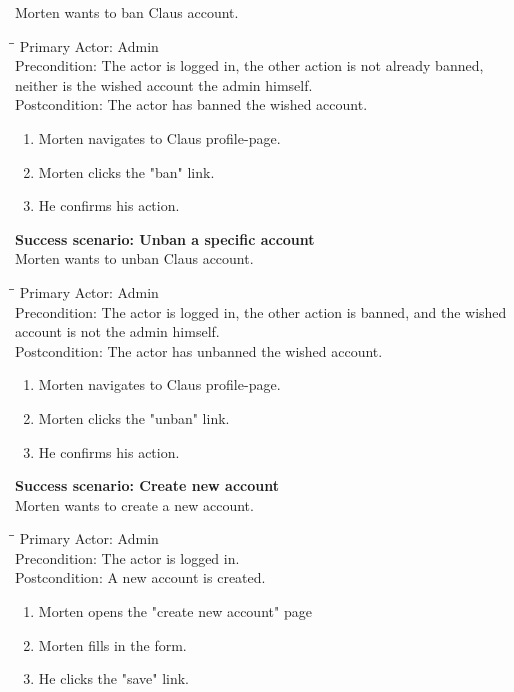 Morten wants to ban Claus account.
\begin{tabbing}
\hspace{5mm}\=\hspace{26mm}\=\kill
\>Primary Actor:\> Admin\\
\>Precondition:\> The actor is logged in, the other action is not already banned, neither is the wished account the admin himself.\\
\>Postcondition:\> The actor has banned the wished account.
\end{tabbing}
\begin{enumerate} \setlength{\itemsep}{-1mm}
	\item Morten navigates to Claus profile-page.
	\item Morten clicks the "ban" link.
	\item He confirms his action.
\end{enumerate}
\vspace{3mm}
\textbf{Success scenario: Unban a specific account} \\
Morten wants to unban Claus account.
\begin{tabbing}
\hspace{5mm}\=\hspace{26mm}\=\kill
\>Primary Actor:\> Admin\\
\>Precondition:\> The actor is logged in, the other action is banned, and the wished account is not the admin himself.\\
\>Postcondition:\> The actor has unbanned the wished account.
\end{tabbing}
\begin{enumerate} \setlength{\itemsep}{-1mm}
	\item Morten navigates to Claus profile-page.
	\item Morten clicks the "unban" link.
	\item He confirms his action.
\end{enumerate}
\vspace{3mm}
\textbf{Success scenario: Create new account} \\
Morten wants to create a new account.
\begin{tabbing}
\hspace{5mm}\=\hspace{26mm}\=\kill
\>Primary Actor:\> Admin\\
\>Precondition:\> The actor is logged in.\\
\>Postcondition:\> A new account is created.
\end{tabbing}
\begin{enumerate} \setlength{\itemsep}{-1mm}
	\item Morten opens the "create new account" page
	\item Morten fills in the form.
	\item He clicks the "save" link.
\end{enumerate}